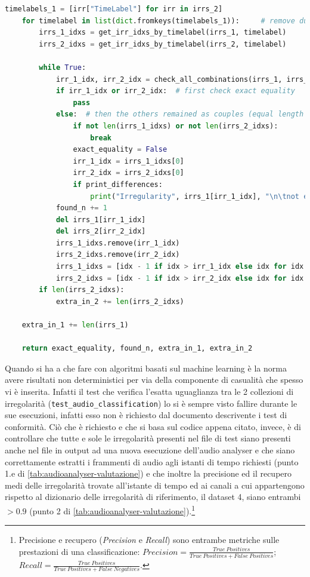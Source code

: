 \begin{lstlisting}[language=Python]
    timelabels_1 = [irr["TimeLabel"] for irr in irrs_2]
    for timelabel in list(dict.fromkeys(timelabels_1)):     # remove duplicates
        irrs_1_idxs = get_irr_idxs_by_timelabel(irrs_1, timelabel)
        irrs_2_idxs = get_irr_idxs_by_timelabel(irrs_2, timelabel)

        while True:
            irr_1_idx, irr_2_idx = check_all_combinations(irrs_1, irrs_1_idxs, irrs_2, irrs_2_idxs)
            if irr_1_idx or irr_2_idx:  # first check exact equality
                pass
            else:  # then the others remained as couples (equal length already checked)
                if not len(irrs_1_idxs) or not len(irrs_2_idxs):
                    break
                exact_equality = False
                irr_1_idx = irrs_1_idxs[0]
                irr_2_idx = irrs_2_idxs[0]
                if print_differences:
                    print("Irregularity", irrs_1[irr_1_idx], "\n\tnot exactly equal to\n\t", irrs_2[irr_2_idx])
            found_n += 1
            del irrs_1[irr_1_idx]
            del irrs_2[irr_2_idx]
            irrs_1_idxs.remove(irr_1_idx)
            irrs_2_idxs.remove(irr_2_idx)
            irrs_1_idxs = [idx - 1 if idx > irr_1_idx else idx for idx in irrs_1_idxs]
            irrs_2_idxs = [idx - 1 if idx > irr_2_idx else idx for idx in irrs_2_idxs]
        if len(irrs_2_idxs):
            extra_in_2 += len(irrs_2_idxs)

    extra_in_1 += len(irrs_1)

    return exact_equality, found_n, extra_in_1, extra_in_2
\end{lstlisting}

Quando si ha a che fare con algoritmi basati sul machine learning è la norma avere risultati non deterministici per via della componente di casualità che spesso vi è inserita.
Infatti il test che verifica l'esatta uguaglianza tra le 2 collezioni di irregolarità (\verb|test_audio_classification|) lo si è sempre visto fallire durante le sue esecuzioni, infatti esso non è richiesto dal documento descrivente i test di conformità.
Ciò che è richiesto e che si basa sul codice appena citato, invece, è di controllare che tutte e sole le irregolarità presenti nel file di test siano presenti anche nel file in output ad una nuova esecuzione dell'audio analyser e che siano correttamente estratti i frammenti di audio agli istanti di tempo richiesti (punto 1.e di \ref{tab:audioanalyser-valutazione}) e che inoltre la precisione ed il recupero medi delle irregolarità trovate all'istante di tempo ed ai canali a cui appartengono rispetto al dizionario delle irregolarità di riferimento, il dataset 4, siano entrambi $>0.9$ (punto 2 di \ref{tab:audioanalyser-valutazione}).\footnote{Precisione e recupero (\textit{Precision} e \textit{Recall}) sono entrambe metriche sulle prestazioni di una classificazione: $Precision=\frac{True\ Positives}{True\ Positives + False\ Positives}$; $Recall=\frac{True\ Positives}{True\ Positives + False\ Negatives}$.}


